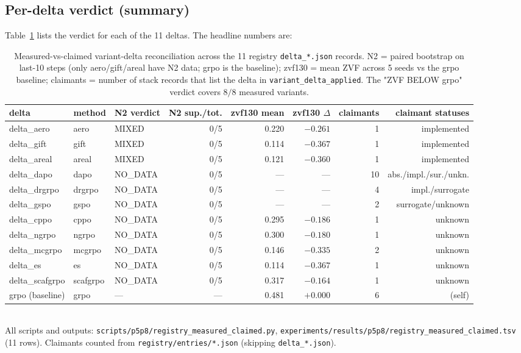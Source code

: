 \subsection{Per-delta verdict (summary)}
Table~\ref{tab:p6-measured-claimed} lists the verdict for each of the
11 deltas. The headline numbers are:

\begin{table}[t]
\centering
\caption{Measured-vs-claimed variant-delta reconciliation across the
11 registry \texttt{delta\_*.json} records. N2 = paired bootstrap on
last-10 steps (only aero/gift/areal have N2 data; grpo is the
baseline); zvf130 = mean ZVF across 5 seeds vs the grpo baseline;
claimants = number of stack records that list the delta in
\texttt{variant\_delta\_applied}. The "ZVF BELOW grpo" verdict covers
$8/8$ measured variants.}
\label{tab:p6-measured-claimed}
\small
\begin{tabular}{lllrrrrr}
\toprule
delta & method & N2 verdict & N2 sup./tot. & zvf130 mean & zvf130 $\Delta$ & claimants & claimant statuses \\
\midrule
delta\_aero    & aero    & MIXED    & 0/5 & 0.220 & $-0.261$ & 1  & implemented \\
delta\_gift    & gift    & MIXED    & 0/5 & 0.114 & $-0.367$ & 1  & implemented \\
delta\_areal   & areal   & MIXED    & 0/5 & 0.121 & $-0.360$ & 1  & implemented \\
delta\_dapo    & dapo    & NO\_DATA & 0/5 & ---   & ---      & 10 & abs./impl./sur./unkn. \\
delta\_drgrpo  & drgrpo  & NO\_DATA & 0/5 & ---   & ---      & 4  & impl./surrogate \\
delta\_gspo    & gspo    & NO\_DATA & 0/5 & ---   & ---      & 2  & surrogate/unknown \\
delta\_cppo    & cppo    & NO\_DATA & 0/5 & 0.295 & $-0.186$ & 1  & unknown \\
delta\_ngrpo   & ngrpo   & NO\_DATA & 0/5 & 0.300 & $-0.180$ & 1  & unknown \\
delta\_mcgrpo  & mcgrpo  & NO\_DATA & 0/5 & 0.146 & $-0.335$ & 2  & unknown \\
delta\_es      & es      & NO\_DATA & 0/5 & 0.114 & $-0.367$ & 1  & unknown \\
delta\_scafgrpo& scafgrpo& NO\_DATA & 0/5 & 0.317 & $-0.164$ & 1  & unknown \\
\midrule
grpo (baseline) & grpo  & ---      & ---  & 0.481 & $+0.000$ & 6  & (self) \\
\bottomrule
\end{tabular}\\
\footnotesize{All scripts and outputs:
\texttt{scripts/p5p8/registry\_measured\_claimed.py},
\texttt{experiments/results/p5p8/registry\_measured\_claimed.tsv} (11
rows). Claimants counted from
\texttt{registry/entries/*.json} (skipping \texttt{delta\_*.json}).
}
\end{table}

